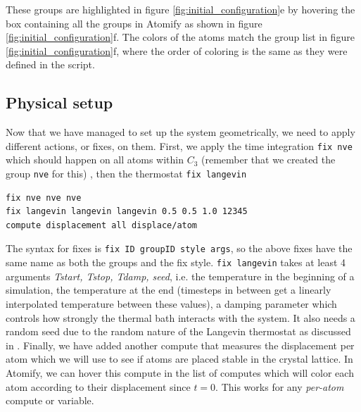 \documentclass[12pt,a4paper,final]{iopart}
\newcommand{\code}[1]{\colorbox{light-gray}{\color{RawSienna}\texttt{#1}}}
\begin{document}
These groups are highlighted in figure \ref{fig:initial_configuration}e by hovering the
box containing all the groups in Atomify as shown in figure \ref{fig:initial_configuration}f.
The colors of the atoms match the group list in figure \ref{fig:initial_configuration}f,
where the order of coloring is the same as they were defined in the script.

\subsection{Physical setup}
Now that we have managed to set up the system geometrically, 
we need to apply different actions, or fixes, on them.
First, we apply the time integration \code{fix nve} which
should happen on all atoms within $C_3$ (remember that we created the group \code{nve} for this)
, then the thermostat \code{fix langevin}

\begin{lstlisting}
fix nve nve nve
fix langevin langevin langevin 0.5 0.5 1.0 12345
compute displacement all displace/atom
\end{lstlisting}

The syntax for fixes is \code{fix ID groupID style args}, so the above fixes have the same name as both the groups and the fix style.
\code{fix langevin} takes at least 4 arguments \textit{Tstart, Tstop, Tdamp, seed}, i.e.
the temperature in the beginning of a simulation, the temperature at the end (timesteps in between get a linearly
interpolated temperature between these values), a damping parameter which controls how strongly the thermal bath interacts with the system.
It also needs a random seed due to the random nature of the Langevin thermostat as discussed in \cite{schneider1978molecular}.
Finally, we have added another compute that measures the displacement per atom which we will use to see if atoms are placed stable in the crystal lattice.
In Atomify, we can hover this compute in the list of computes which will color each atom according to their displacement since $t=0$.
This works for any \textit{per-atom} compute or variable.
\end{document}
